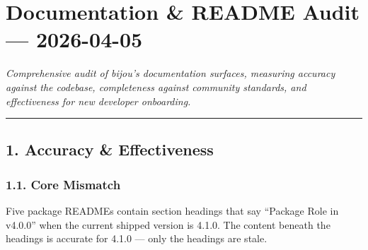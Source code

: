\chapter{Documentation \& README Audit --- 2026-04-05}\label{record-412}

\smallskip

\emph{Comprehensive audit of bijou's documentation surfaces, measuring accuracy against the codebase, completeness against community standards, and effectiveness for new developer onboarding.}

\begin{center}\rule{0.5\linewidth}{0.5pt}\end{center}

\section{1. Accuracy \& Effectiveness}\label{record-412-accuracy-effectiveness}

\subsection{1.1. Core Mismatch}\label{record-412-core-mismatch}

Five package READMEs contain section headings that say ``Package Role in v4.0.0'' when the current shipped version is 4.1.0. The content beneath the headings is accurate for 4.1.0 --- only the headings are stale.

